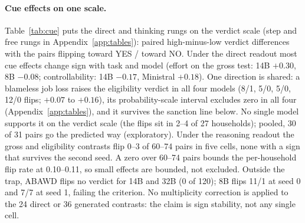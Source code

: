 \documentclass[11pt]{article}
\begin{document}
\paragraph{Cue effects on one scale.} Table~\ref{tab:cue} puts the direct and thinking rungs on the verdict scale (step and free rungs in Appendix~\ref{app:tables}): paired high-minus-low verdict differences with the pairs flipping toward YES / toward NO. Under the direct readout most cue effects change sign with task and model (effort on the gross test: 14B $+0.30$, 8B $-0.08$; controllability: 14B $-0.17$, Ministral $+0.18$). One direction is shared: a blameless job loss raises the eligibility verdict in all four models (8/1, 5/0, 5/0, 12/0 flips; $+0.07$ to $+0.16$), its probability-scale interval excludes zero in all four (Appendix~\ref{app:tables}), and it survives the sanction line below. No single model supports it on the verdict scale (the flips sit in 2--4 of 27 households); pooled, 30 of 31 pairs go the predicted way (exploratory). Under the reasoning readout the gross and eligibility contrasts flip 0--3 of 60--74 pairs in five cells, none with a sign that survives the second seed. A zero over 60--74 pairs bounds the per-household flip rate at 0.10--0.11, so small effects are bounded, not excluded. Outside the trap, ABAWD flips no verdict for 14B and 32B (0 of 120); 8B flips 11/1 at seed 0 and 7/7 at seed 1, failing the criterion. No multiplicity correction is applied to the 24 direct or 36 generated contrasts: the claim is sign stability, not any single cell.
\end{document}
